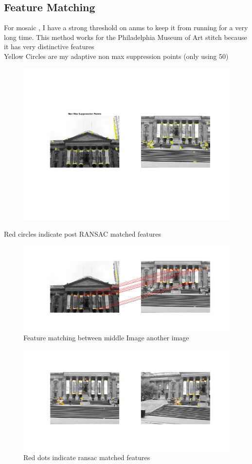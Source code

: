 \documentclass[11pt,english]{article}
\begin{document}
\subsection*{Feature Matching}
For mosaic , I have a strong threshold on anms to keep it from running for a very long time. This method works for the Philadelphia Museum of Art stitch because it has very distinctive features
\\
Yellow Circles are my adaptive non max suppression points (only using 50) 
\begin{figure}[h]
\includegraphics[width = \linewidth]{anms_pts}
\end{figure}
Red circles indicate post RANSAC matched features 
\begin{figure}[h]
\includegraphics[width = \linewidth]{feature_matching_pma}
 \caption{Feature matching between middle Image another image}
\end{figure} 
\begin{figure}[h]
\includegraphics[width = \linewidth]{feature_matching_pma2}
\caption{ Red dots indicate ransac matched features}
\end{figure} 
\FloatBarrier 
\end{document}
